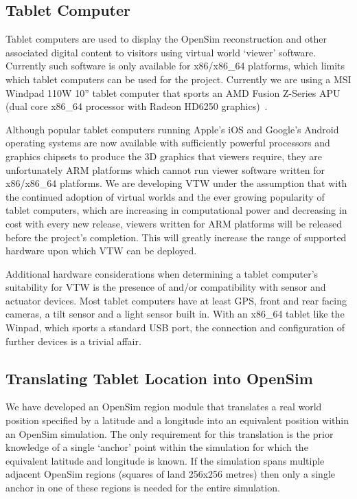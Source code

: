 \documentclass[conference,a4paper]{IEEEtran}
\begin{document}
\subsection{Tablet Computer}
Tablet computers are used to display the OpenSim reconstruction and other associated digital content to visitors using virtual world `viewer' software. Currently such software is only available for x86/x86\_64 platforms, which limits which tablet computers can be used for the project. Currently we are using a MSI Windpad 110W 10'' tablet computer that sports an AMD Fusion Z-Series APU (dual core x86\_64 processor with Radeon HD6250 graphics)~\cite{Micro-StarInt'lCo.}.

Although popular tablet computers running Apple's iOS and Google's Android operating systems are now available with sufficiently powerful processors and graphics chipsets to produce the 3D graphics that viewers require, they are unfortunately ARM platforms which cannot run viewer software written for x86/x86\_64 platforms. We are developing VTW under the assumption that with the continued adoption of virtual worlds and the ever growing popularity of tablet computers, which are increasing in computational power and decreasing in cost with every new release, viewers written for ARM platforms will be released before the project's completion. This will greatly increase the range of supported hardware upon which VTW can be deployed.

Additional hardware considerations when determining a tablet computer's suitability for VTW is the presence of and/or compatibility with sensor and actuator devices. Most tablet computers have at least GPS, front and rear facing cameras, a tilt sensor and a light sensor built in. With an x86\_64 tablet like the Winpad, which sports a standard USB port, the connection and configuration of further devices is a trivial affair.

\subsection{Translating Tablet Location into OpenSim}
We have developed an OpenSim region module that translates a real world position specified by a latitude and a longitude into an equivalent position within an OpenSim simulation. The only requirement for this translation is the prior knowledge of a single `anchor' point within the simulation for which the equivalent latitude and longitude is known. If the simulation spans multiple adjacent OpenSim regions (squares of land 256x256 metres) then only a single anchor in one of these regions is needed for the entire simulation.
\end{document}
